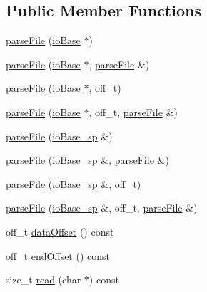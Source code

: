 \subsection*{Public Member Functions}
\begin{DoxyCompactItemize}
\item 
\mbox{\hyperlink{classebml_1_1parseFile_addbb25f11021e4a9a1bd0acd90920d3e}{parse\+File}} (\mbox{\hyperlink{classebml_1_1ioBase}{io\+Base}} $\ast$)
\item 
\mbox{\hyperlink{classebml_1_1parseFile_a4284c3ccdc27c8b565ff9ce153d18dfe}{parse\+File}} (\mbox{\hyperlink{classebml_1_1ioBase}{io\+Base}} $\ast$, \mbox{\hyperlink{classebml_1_1parseFile}{parse\+File}} \&)
\item 
\mbox{\hyperlink{classebml_1_1parseFile_a281ce4000db95e3fe7e615bc6f107a19}{parse\+File}} (\mbox{\hyperlink{classebml_1_1ioBase}{io\+Base}} $\ast$, off\+\_\+t)
\item 
\mbox{\hyperlink{classebml_1_1parseFile_a2887fe3092c747e3d394df7000eb453c}{parse\+File}} (\mbox{\hyperlink{classebml_1_1ioBase}{io\+Base}} $\ast$, off\+\_\+t, \mbox{\hyperlink{classebml_1_1parseFile}{parse\+File}} \&)
\item 
\mbox{\hyperlink{classebml_1_1parseFile_a5176b0a55a3accad822aea60376a197f}{parse\+File}} (\mbox{\hyperlink{namespaceebml_a7bb59128ac6af27e47367938a846b569}{io\+Base\+\_\+sp}} \&)
\item 
\mbox{\hyperlink{classebml_1_1parseFile_a727eaa5e34192a3c96fbe5bd728af489}{parse\+File}} (\mbox{\hyperlink{namespaceebml_a7bb59128ac6af27e47367938a846b569}{io\+Base\+\_\+sp}} \&, \mbox{\hyperlink{classebml_1_1parseFile}{parse\+File}} \&)
\item 
\mbox{\hyperlink{classebml_1_1parseFile_af0fa4cc564dd463ffe976ade75d828fa}{parse\+File}} (\mbox{\hyperlink{namespaceebml_a7bb59128ac6af27e47367938a846b569}{io\+Base\+\_\+sp}} \&, off\+\_\+t)
\item 
\mbox{\hyperlink{classebml_1_1parseFile_ace383c50a02485d9f5bd8613e55c6350}{parse\+File}} (\mbox{\hyperlink{namespaceebml_a7bb59128ac6af27e47367938a846b569}{io\+Base\+\_\+sp}} \&, off\+\_\+t, \mbox{\hyperlink{classebml_1_1parseFile}{parse\+File}} \&)
\item 
off\+\_\+t \mbox{\hyperlink{classebml_1_1parseFile_af1b31606933caa71ac6c7b2556607eb8}{data\+Offset}} () const
\item 
off\+\_\+t \mbox{\hyperlink{classebml_1_1parseFile_a270d6f5aab6037135eceb972e5843ce0}{end\+Offset}} () const
\item 
size\+\_\+t \mbox{\hyperlink{classebml_1_1parseFile_aee264dab6cd22ef1754e36615268a8a0}{read}} (char $\ast$) const

\end{DoxyCompactItemize}
